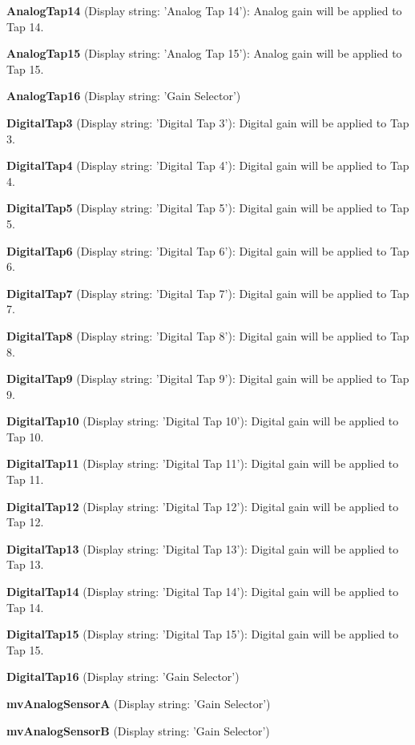 \begin{DoxyItemize}
\item {\bfseries Analog\+Tap14} (Display string\+: 'Analog Tap 14')\+: Analog gain will be applied to Tap 14.
\item {\bfseries Analog\+Tap15} (Display string\+: 'Analog Tap 15')\+: Analog gain will be applied to Tap 15.
\item {\bfseries Analog\+Tap16} (Display string\+: 'Gain Selector')
\item {\bfseries Digital\+Tap3} (Display string\+: 'Digital Tap 3')\+: Digital gain will be applied to Tap 3.
\item {\bfseries Digital\+Tap4} (Display string\+: 'Digital Tap 4')\+: Digital gain will be applied to Tap 4.
\item {\bfseries Digital\+Tap5} (Display string\+: 'Digital Tap 5')\+: Digital gain will be applied to Tap 5.
\item {\bfseries Digital\+Tap6} (Display string\+: 'Digital Tap 6')\+: Digital gain will be applied to Tap 6.
\item {\bfseries Digital\+Tap7} (Display string\+: 'Digital Tap 7')\+: Digital gain will be applied to Tap 7.
\item {\bfseries Digital\+Tap8} (Display string\+: 'Digital Tap 8')\+: Digital gain will be applied to Tap 8.
\item {\bfseries Digital\+Tap9} (Display string\+: 'Digital Tap 9')\+: Digital gain will be applied to Tap 9.
\item {\bfseries Digital\+Tap10} (Display string\+: 'Digital Tap 10')\+: Digital gain will be applied to Tap 10.
\item {\bfseries Digital\+Tap11} (Display string\+: 'Digital Tap 11')\+: Digital gain will be applied to Tap 11.
\item {\bfseries Digital\+Tap12} (Display string\+: 'Digital Tap 12')\+: Digital gain will be applied to Tap 12.
\item {\bfseries Digital\+Tap13} (Display string\+: 'Digital Tap 13')\+: Digital gain will be applied to Tap 13.
\item {\bfseries Digital\+Tap14} (Display string\+: 'Digital Tap 14')\+: Digital gain will be applied to Tap 14.
\item {\bfseries Digital\+Tap15} (Display string\+: 'Digital Tap 15')\+: Digital gain will be applied to Tap 15.
\item {\bfseries Digital\+Tap16} (Display string\+: 'Gain Selector')
\item {\bfseries mv\+Analog\+Sensor\+A} (Display string\+: 'Gain Selector')
\item {\bfseries mv\+Analog\+Sensor\+B} (Display string\+: 'Gain Selector')
\end{DoxyItemize}

